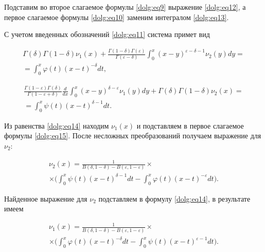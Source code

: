 Подставим во второе слагаемое формулы \eqref{dolg:eq9} выражение \eqref{dolg:eq12}, а первое слагаемое формулы \eqref{dolg:eq10} заменим интегралом \eqref{dolg:eq13}. 

С учетом введенных обозначений \eqref{dolg:eq11} система примет вид

\begin{multline}\label{dolg:eq14}

\Gamma(\delta) \Gamma(1-\delta) \nu_1(x) + \frac{\Gamma(1-\delta)\Gamma(\varepsilon)}{\Gamma(\varepsilon-\delta)} \int _0^x (x-y)^{\varepsilon-\delta-1} \nu_2(y) dy =

\\

=

 \int _0^x \varphi(t) (x-t)^{-\delta} dt,

\end{multline}

\begin{multline}\label{dolg:eq15}

\frac{\Gamma(1-\varepsilon)\Gamma(\delta)}{\Gamma(1-\varepsilon+\delta)} \frac{d}{dx} \int _0^x (x-y)^{\delta-\varepsilon} \nu_1(y) dy + \Gamma(\delta) \Gamma(1-\delta) \nu_2(x) = \\ = \int _0^x \psi(t) (x-t)^{\delta-1} dt.

\end{multline}



Из равенства \eqref{dolg:eq14} находим $\nu_1(x)$ и подставляем  в первое слагаемое формулы \eqref{dolg:eq15}. После несложных преобразований получаем  выражение для $\nu_2$:

\begin{multline}\label{dolg:eq16}

\nu_2(x) = \frac{1}{B(\delta, 1-\delta)- B(\varepsilon, 1-\varepsilon)} 

\times 

\\

\times

 \biggl(\int _0^x \psi(t) (x-t)^{\delta-1} dt - \int _0^x \varphi(t) (x-t)^{-\varepsilon} dt\biggr).

\end{multline}

Найденное выражение для $\nu_2$ подставляем в формулу \eqref{dolg:eq14}, в результате имеем

\begin{multline}\label{dolg:eq17}

\nu_1(x) = \frac{1}{B(\delta, 1-\delta)- B(\varepsilon, 1-\varepsilon)}

\times

\\

\times

 \biggl(\int _0^x \varphi(t) (x-t)^{-\delta} dt - \int _0^x \psi(t) (x-t)^{\varepsilon-1} dt\biggr).

\end{multline}


